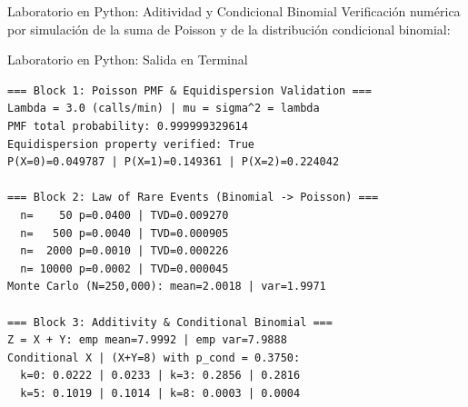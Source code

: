 \documentclass[10pt, aspectratio=169]{beamer}
\begin{document}
\begin{frame}[fragile]{Laboratorio en Python: Aditividad y Condicional Binomial}
  \scriptsize
  Verificación numérica por simulación de la suma de Poisson y de la distribución condicional binomial:
  \vspace{0.02cm}
  {
  }
\end{frame}

\begin{frame}[fragile]{Laboratorio en Python: Salida en Terminal}
  \vspace{-0.1cm}
  \begin{block}{}
    \fontsize{4.5pt}{5.2pt}\selectfont
    \begin{verbatim}
=== Block 1: Poisson PMF & Equidispersion Validation ===
Lambda = 3.0 (calls/min) | mu = sigma^2 = lambda
PMF total probability: 0.999999329614
Equidispersion property verified: True
P(X=0)=0.049787 | P(X=1)=0.149361 | P(X=2)=0.224042

=== Block 2: Law of Rare Events (Binomial -> Poisson) ===
  n=    50 p=0.0400 | TVD=0.009270
  n=   500 p=0.0040 | TVD=0.000905
  n=  2000 p=0.0010 | TVD=0.000226
  n= 10000 p=0.0002 | TVD=0.000045
Monte Carlo (N=250,000): mean=2.0018 | var=1.9971

=== Block 3: Additivity & Conditional Binomial ===
Z = X + Y: emp mean=7.9992 | emp var=7.9888
Conditional X | (X+Y=8) with p_cond = 0.3750:
  k=0: 0.0222 | 0.0233 | k=3: 0.2856 | 0.2816
  k=5: 0.1019 | 0.1014 | k=8: 0.0003 | 0.0004
    \end{verbatim}
  \end{block}
\end{frame}
\end{document}
